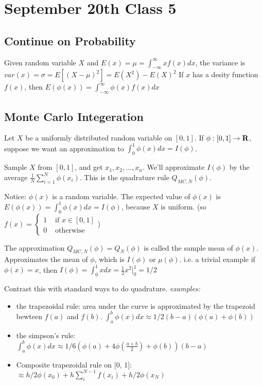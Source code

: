 \section{September 20th Class 5}
\label{sec:class5}

\subsection{Continue on Probability}
\label{sec:prob3}

Given random variable $X$ and $E(x)=\mu = \int_{-\infty}^{\infty}xf(x)dx$,
the variance is $var(x)=\sigma=E[(X-\mu)^2] = E(X^2)-E(X)^2$
If $x$ has a desity function $f(x)$, then
$E(\phi(x))=\int_{-\infty}^\infty \phi(x)f(x)dx$

\subsection{Monte Carlo Integeration}
\label{sec:montecarlo}
Let $X$ be a uniformly distributed random variable on $[0,1]$. If
$\phi:[0,1]\rightarrow \mathbf{R}$, suppose we want an approximation to
$\int_0^1\phi(x)dx = I(\phi)$.

Sample $X$ from $[0,1]$, and get $x_1, x_2, \dots, x_n$. We'll
approximate $I(\phi)$ by the average
$\frac{1}{N}\sum_{i=1}^N\phi(x_i)$. This is the quadrature rule
$Q_{MC, N}(\phi)$.

Notice: $\phi(x)$ is a random variable. The expected value of
$\phi(x)$ is $E(\phi(x)) = \int_{0}^1 \phi(x)dx = I(\phi)$, because $X$
is uniform. (so $f(x) =
\begin{cases}
1 & \text{ if }  x\in [0,1]\\
0 & \text{ otherwise}
\end{cases}
$)

The approximation $Q_{MC,N}(\phi) = Q_N(\phi)$ is called the sample
mean of $\phi(x)$. Approximates the mean of $\phi$, which is $I(\phi)$
or $\mu(\phi)$. i.e. a trivial example if $\phi(x) = x$, then $I(\phi)
= \int_0^1xdx = \frac{1}{2}x^2|_0^1 = 1/2$

Contrast this with standard ways to do quadrature.
\emph{examples:}
\begin{itemize}
\item  the trapezoidal rule: area under the curve is approximated by
  the trapezoid bewteen $f(a)$ and $f(b)$. $\int_a^b\phi(x)dx \approx 1/2(b-a)(\phi(a)+\phi(b))$
\item the simpson's rule: $\int_a^b\phi(x)dx\approx 1/6(\phi(a) +
  4\phi(\frac{a+b}{2}) + \phi(b))(b-a)$
\item Composite trapezoidal rule on [0, 1]: $\approx h/2\phi(x_0) +h\sum_i^{N-1}f(x_i) + h/2\phi(x_N)$
\end{itemize}

